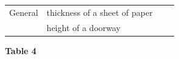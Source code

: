 {{\begin{center}
\begin{xtabular}[t]{|l|l|l|l|}
        General &
    
    
        thickness of a sheet of paper &
    
    
         &
    
    
     \tabularnewline{}
    
    
         &
    
    
        height of a doorway &
    
    
         &
    
    
     \tabularnewline{}
    \end{xtabular}
      \end{center}
    \begin{center}{\small\bfseries Table 4}\end{center}
    
}}
